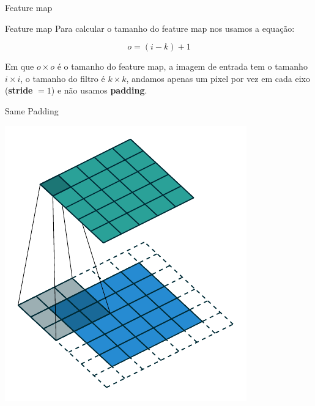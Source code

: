 \documentclass[10pt]{beamer}
\begin{document}
\begin{frame}{Feature map}

\end{frame}


\begin{frame}{Feature map}
Para calcular o tamanho do feature map nos usamos a equação:

\begin{equation*}
 o = (i - k) +1
\end{equation*}


Em que $o \times o$ é o tamanho do feature map, a imagem de entrada tem o tamanho $i \times i$, o tamanho do filtro é $k \times k$, andamos apenas um pixel por vez em cada eixo (\textbf{stride} $= 1$) e não usamos \textbf{padding}.
\end{frame}

\begin{frame}{Same Padding}
\begin{center}
\includegraphics[scale=1]{images/same_padding_no_strides_00.pdf}
\end{center}
\end{frame}
\end{document}

